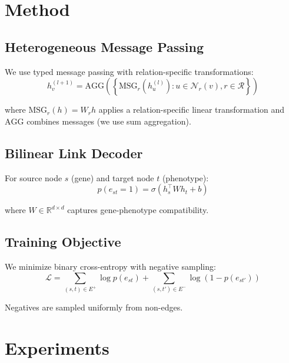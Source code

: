 \documentclass{article}
\begin{document}
\section{Method}

\subsection{Heterogeneous Message Passing}

We use typed message passing with relation-specific transformations:
\begin{equation}
    h_v^{(l+1)} = \text{AGG}\left( \left\{ \text{MSG}_r(h_u^{(l)}) : u \in \mathcal{N}_r(v), r \in \mathcal{R} \right\} \right)
\end{equation}

where $\text{MSG}_r(h) = W_r h$ applies a relation-specific linear transformation and $\text{AGG}$ combines messages (we use sum aggregation).

\subsection{Bilinear Link Decoder}

For source node $s$ (gene) and target node $t$ (phenotype):
\begin{equation}
    p(e_{st} = 1) = \sigma(h_s^\top W h_t + b)
\end{equation}

where $W \in \mathbb{R}^{d \times d}$ captures gene-phenotype compatibility.

\subsection{Training Objective}

We minimize binary cross-entropy with negative sampling:
\begin{equation}
    \mathcal{L} = \sum_{(s,t) \in E^+} \log p(e_{st}) + \sum_{(s,t') \in E^-} \log(1 - p(e_{st'}))
\end{equation}

Negatives are sampled uniformly from non-edges.

\section{Experiments}
\end{document}
